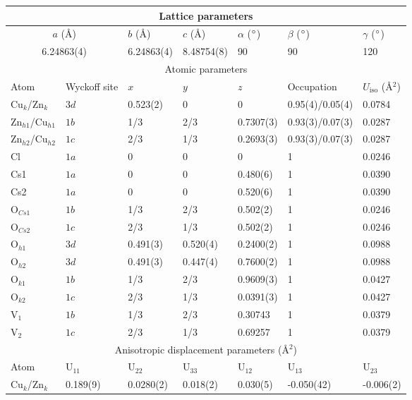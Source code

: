 \documentclass[
sn-mathphys,
Numbered,
onecolumn]
{sn-jnl}%
\begin{document}
\clearpage
\begin{table}
    \centering
    \begin{tabular}{ p{2cm} p{1.8cm} p{2cm} p{} p{} p{} p{}} \hline \hline
    \multicolumn{7}{c}{Lattice parameters} \\ \hline
     \multicolumn{2}{c}{$a$ (\AA)} & $b$ (\AA) & $c$ (\AA) & $\alpha$ ($\degree$) & $\beta$ ($\degree$) & $\gamma$ ($\degree$)    \\ \hline
     \multicolumn{2}{c}{6.24863(4)} & 6.24863(4) & 8.48754(8) & 90 & 90 & 120 \\ \hline
    \multicolumn{7}{c}{Atomic parameters} \\ \hline
     Atom  & Wyckoff site & $x$ & $y$ & $z$ & Occupation & $U_\mathrm{iso}$ (\AA$^2$) \\ \hline
 Cu$_k$/Zn$_k$ & $3d$ &  0.523(2) & 0 & 0  & 0.95(4)/0.05(4)& 0.0784 \\
 Zn$_{h1}$/Cu$_{h1}$ & $1b$ & 1/3 & 2/3  & 0.7307(3)  & 0.93(3)/0.07(3) & 0.0287  \\
 Zn$_{h2}$/Cu$_{h2}$ & $1c$ & 2/3 & 1/3  & 0.2693(3)  & 0.93(3)/0.07(3) & 0.0287  \\
 Cl & $1a$ & 0  & 0 & 0 & 1 & 0.0246  \\
 Cs1 &  $1a$ &  0 &  0 &  0.480(6) & 1 & 0.0390 \\
 Cs2 &  $1a$ &  0 &  0 &  0.520(6) & 1 & 0.0390 \\
 O$_{Cs1}$ & $1b$ & 1/3 & 2/3 & 0.502(2) & 1 & 0.0246  \\
 O$_{Cs2}$ & $1c$ & 2/3 & 1/3 & 0.502(2) & 1 & 0.0246  \\
 O$_{h1}$  & $3d$ & 0.491(3) & 0.520(4) & 0.2400(2) & 1 & 0.0988 \\
 O$_{h2}$  & $3d$ & 0.491(3) & 0.447(4) & 0.7600(2) & 1 & 0.0988 \\
 O$_{k1}$  & $1b$ & 1/3  & 2/3  & 0.9609(3) & 1 & 0.0427 \\
 O$_{k2}$  & $1c$ & 2/3  & 1/3  & 0.0391(3) & 1 & 0.0427 \\
 V$_1$  & $1b$ & 1/3  & 2/3  & 0.30743 & 1 & 0.0379 \\
 V$_2$  & $1c$ & 2/3  & 1/3  & 0.69257 & 1 & 0.0379 \\
    \hline 
    \multicolumn{7}{c}{Anisotropic displacement parameters (\AA$^2$)} \\ \hline 
  Atom &  U$_{11}$ & U$_{22}$ & U$_{33}$ & U$_{12}$ & U$_{13}$ & U$_{23}$ \\ \hline 
Cu$_k$/Zn$_k$ & 0.189(9) & 0.0280(2) & 0.018(2) & 0.030(5) &  -0.050(42) & -0.006(2) \\

\end{tabular}
\end{table}
\end{document}
